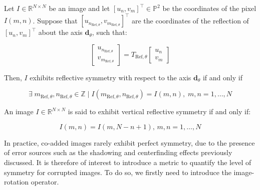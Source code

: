 \begin{definition}
    \label{def:refl_symm_alpha}
    
    Let $I\in\mathbb{R}^{N\times N}$ be an image and let $[u_n,v_m]^\top \in \mathbb{P}^2$ be the coordinates of the pixel $I(m,n)$. Suppose that $[u_{n_{\mathrm{Ref},\theta}},v_{m_{\mathrm{Ref},\theta}}]^\top$ are the coordinates of the reflection of $[u_n,v_m]^\top$ about the axis $\mathbf{d}_\theta$, such that:

    \begin{equation}
        \begin{bmatrix}
            u_{n_{\mathrm{Ref},\theta}} \\ v_{m_{\mathrm{Ref},\theta}}
        \end{bmatrix} = T_{\mathrm{Ref},\theta}
        \begin{bmatrix}
            u_n \\ v_m
        \end{bmatrix}
    \end{equation}

    Then, $I$ exhibits reflective symmetry with respect to the axis $\mathbf{d}_\theta$ if and only if

    \begin{equation}
        \exists \; m_{\mathrm{Ref},\theta},n_{\mathrm{Ref},\theta} \in \mathbb{Z} \; | \; I(m_{\mathrm{Ref},\theta},n_{\mathrm{Ref},\theta}) = I(m,n),\; m,n=1,\dots,N
    \end{equation}
\end{definition}



\begin{definition}
    \label{def:vert_refl_symm}
    An image $I\in\mathbb{R}^{N\times N}$ is said to exhibit vertical reflective symmetry if and only if:

    \begin{equation}
        I(m,n) = I(m,N-n+1),\,m,n=1,\dots,N
    \end{equation}
\end{definition}

In practice, co-added images rarely exhibit perfect symmetry, due to the presence of error sources such as the shadowing and centerfinding effects previously discussed. It is therefore of interest to introduce a metric to quantify the level of symmetry for corrupted images. To do so, we firstly need to introduce the image-rotation operator.

